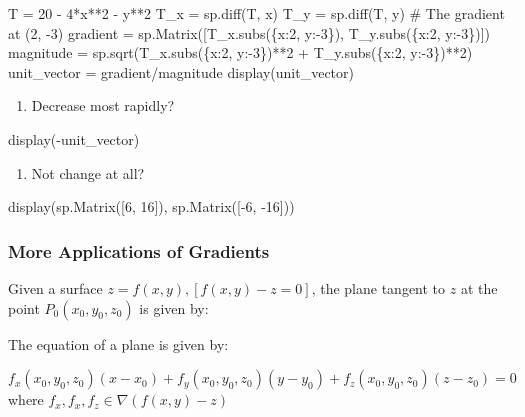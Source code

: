 \documentclass[
  letterpaper,
  DIV=11,
  numbers=noendperiod]{scrartcl}
\newenvironment{Shaded}{\begin{snugshade}}{\end{snugshade}}
\newcommand{\NormalTok}[1]{\textcolor[rgb]{0.00,0.23,0.31}{#1}}
\providecommand{\tightlist}{%
  \setlength{\itemsep}{0pt}\setlength{\parskip}{0pt}}\usepackage{longtable,booktabs,array}
\begin{document}
\begin{Shaded}
\begin{Highlighting}[numbers=left,,]
\NormalTok{T = 20 {-} 4*x**2 {-} y**2}
\NormalTok{T\_x = sp.diff(T, x)}
\NormalTok{T\_y = sp.diff(T, y)}
\NormalTok{\# The gradient at (2, {-}3)}
\NormalTok{gradient = sp.Matrix([T\_x.subs(\{x:2, y:{-}3\}), T\_y.subs(\{x:2, y:{-}3\})])}
\NormalTok{magnitude = sp.sqrt(T\_x.subs(\{x:2, y:{-}3\})**2 + T\_y.subs(\{x:2, y:{-}3\})**2)}
\NormalTok{unit\_vector = gradient/magnitude}
\NormalTok{display(unit\_vector)}
\end{Highlighting}
\end{Shaded}

\begin{enumerate}
\def\labelenumi{\alph{enumi}.}
\setcounter{enumi}{1}
\tightlist
\item
  Decrease most rapidly?
\end{enumerate}

\begin{Shaded}
\begin{Highlighting}[numbers=left,,]
\NormalTok{display({-}unit\_vector)}
\end{Highlighting}
\end{Shaded}

\begin{enumerate}
\def\labelenumi{\alph{enumi}.}
\setcounter{enumi}{2}
\tightlist
\item
  Not change at all?
\end{enumerate}

\begin{Shaded}
\begin{Highlighting}[numbers=left,,]
\NormalTok{display(sp.Matrix([6, 16]), sp.Matrix([{-}6, {-}16]))}
\end{Highlighting}
\end{Shaded}

\subsubsection{More Applications of
Gradients}\label{more-applications-of-gradients}

Given a surface \(z=f(x, y), [f(x, y)-z=0]\), the plane tangent to \(z\)
at the point \(P_0(x_0, y_0, z_0)\) is given by:

The equation of a plane is given by:

\(f_x(x_0, y_0, z_0)(x-x_0)+f_y(x_0, y_0, z_0)(y-y_0)+f_z(x_0, y_0, z_0)(z-z_0) = 0\)
where \(f_x, f_x, f_z \in \nabla (f(x, y)-z)\)
\end{document}
